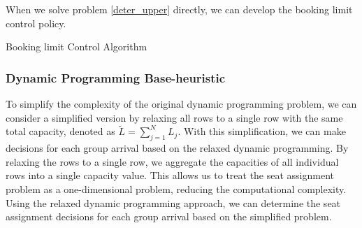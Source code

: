 When we solve problem \eqref{deter_upper} directly, we can develop the booking limit control policy.

\begin{algorithm}[H]
  \caption{Booking limit Control Algorithm}\label{algo_booking}
\end{algorithm}


\subsubsection*{Dynamic Programming Base-heuristic}
To simplify the complexity of the original dynamic programming problem, we can consider a simplified version by relaxing all rows to a single row with the same total capacity, denoted as $\tilde{L} = \sum_{j=1}^{N} L_j$. With this simplification, we can make decisions for each group arrival based on the relaxed dynamic programming. By relaxing the rows to a single row, we aggregate the capacities of all individual rows into a single capacity value. This allows us to treat the seat assignment problem as a one-dimensional problem, reducing the computational complexity. Using the relaxed dynamic programming approach, we can determine the seat assignment decisions for each group arrival based on the simplified problem.



